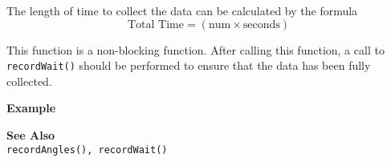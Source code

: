 The length of time to collect the data can be calculated by the formula \\
\begin{equation*}
\text{Total Time} = (\text{num} \times \text{seconds}) 
\end{equation*}

This function is a non-blocking function. After calling this function, a call to
\texttt{recordWait()} should be performed to ensure that the data has been fully collected.

\noindent
{\bf Example}\\
\noindent

\noindent
{\bf See Also}\\
\texttt{recordAngles(), recordWait()} \\
